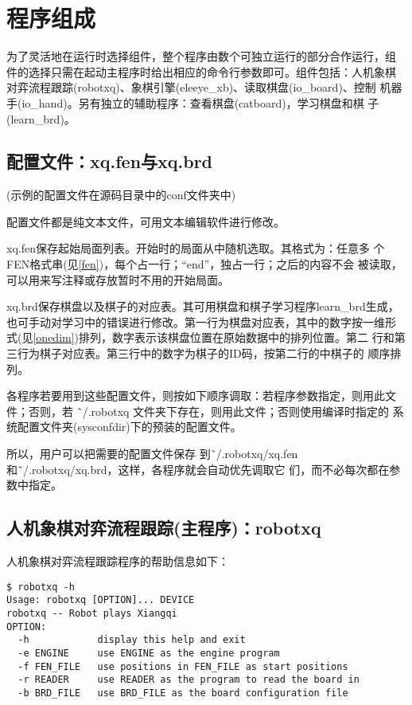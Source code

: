 \documentclass[a4paper]{article}
\begin{document}
\section{程序组成}
为了灵活地在运行时选择组件，整个程序由数个可独立运行的部分合作运行，组
件的选择只需在起动主程序时给出相应的命令行参数即可。组件包括：人机象棋
对弈流程跟踪(robotxq)、象棋引擎(eleeye\_xb)、读取棋盘(io\_board)、控制
机器手(io\_hand)。另有独立的辅助程序：查看棋盘(catboard)，学习棋盘和棋
子(learn\_brd)。

\subsection{配置文件：xq.fen与xq.brd}
\label{conf}
(示例的配置文件在源码目录中的conf文件夹中)

配置文件都是纯文本文件，可用文本编辑软件进行修改。

xq.fen保存起始局面列表。开始时的局面从中随机选取。其格式为：任意多
个FEN格式串(见\ref{fen})，每个占一行；``end''，独占一行；之后的内容不会
被读取，可以用来写注释或存放暂时不用的开始局面。

xq.brd保存棋盘以及棋子的对应表。其可用棋盘和棋子学习程序learn\_brd生成，
也可手动对学习中的错误进行修改。第一行为棋盘对应表，其中的数字按一维形
式(见\ref{onedim})排列，数字表示该棋盘位置在原始数据中的排列位置。第二
行和第三行为棋子对应表。第三行中的数字为棋子的ID码，按第二行的中棋子的
顺序排列。

各程序若要用到这些配置文件，则按如下顺序调取：若程序参数指定，则用此文
件；否则，若 \~\ /.robotxq 文件夹下存在，则用此文件；否则使用编译时指定的
系统配置文件夹(sysconfdir)下的预装的配置文件。

所以，用户可以把需要的配置文件保存
到\~\ /.robotxq/xq.fen和\~\ /.robotxq/xq.brd，这样，各程序就会自动优先调取它
们，而不必每次都在参数中指定。

\subsection{人机象棋对弈流程跟踪(主程序)：robotxq}
人机象棋对弈流程跟踪程序的帮助信息如下：
\begin{verbatim}
$ robotxq -h
Usage: robotxq [OPTION]... DEVICE
robotxq -- Robot plays Xiangqi
OPTION:
  -h            display this help and exit
  -e ENGINE     use ENGINE as the engine program
  -f FEN_FILE   use positions in FEN_FILE as start positions
  -r READER     use READER as the program to read the board in
  -b BRD_FILE   use BRD_FILE as the board configuration file
\end{verbatim}
\end{document}
